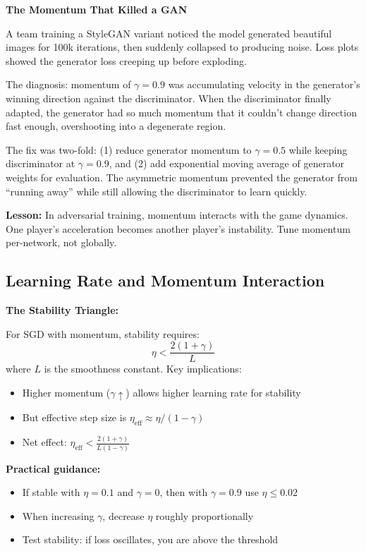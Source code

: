 \documentclass[../../main.tex]{subfiles}
\begin{document}
\begin{warstory}
\textbf{The Momentum That Killed a GAN}

A team training a StyleGAN variant noticed the model generated beautiful images for 100k iterations, then suddenly collapsed to producing noise. Loss plots showed the generator loss creeping up before exploding.

The diagnosis: momentum of $\gamma = 0.9$ was accumulating velocity in the generator's winning direction against the discriminator. When the discriminator finally adapted, the generator had so much momentum that it couldn't change direction fast enough, overshooting into a degenerate region.

The fix was two-fold: (1) reduce generator momentum to $\gamma = 0.5$ while keeping discriminator at $\gamma = 0.9$, and (2) add exponential moving average of generator weights for evaluation. The asymmetric momentum prevented the generator from ``running away'' while still allowing the discriminator to learn quickly.

\textbf{Lesson:} In adversarial training, momentum interacts with the game dynamics. One player's acceleration becomes another player's instability. Tune momentum per-network, not globally.
\end{warstory}

\subsection{Learning Rate and Momentum Interaction}

\begin{keyconcept}
\textbf{The Stability Triangle:}

For SGD with momentum, stability requires:
\[
    \eta < \frac{2(1 + \gamma)}{L}
\]
where $L$ is the smoothness constant. Key implications:

\begin{itemize}
    \item Higher momentum ($\gamma \uparrow$) allows higher learning rate for stability
    \item But effective step size is $\eta_{\text{eff}} \approx \eta / (1 - \gamma)$
    \item Net effect: $\eta_{\text{eff}} < \frac{2(1 + \gamma)}{L(1 - \gamma)}$
\end{itemize}

\textbf{Practical guidance:}
\begin{itemize}
    \item If stable with $\eta = 0.1$ and $\gamma = 0$, then with $\gamma = 0.9$ use $\eta \leq 0.02$
    \item When increasing $\gamma$, decrease $\eta$ roughly proportionally
    \item Test stability: if loss oscillates, you are above the threshold
\end{itemize}
\end{keyconcept}
\end{document}
